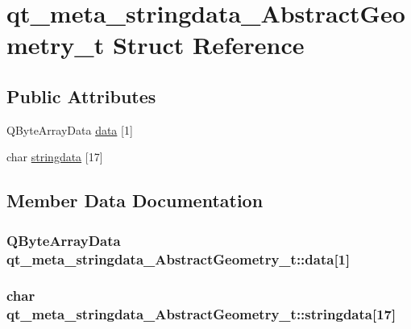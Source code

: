 \hypertarget{structqt__meta__stringdata___abstract_geometry__t}{\section{qt\+\_\+meta\+\_\+stringdata\+\_\+\+Abstract\+Geometry\+\_\+t Struct Reference}
\label{structqt__meta__stringdata___abstract_geometry__t}
}
\subsection*{Public Attributes}
\begin{DoxyCompactItemize}
\item 
Q\+Byte\+Array\+Data \hyperlink{structqt__meta__stringdata___abstract_geometry__t_a0498359dfe03ee62a8dc8336a3d38da8}{data} \mbox{[}1\mbox{]}
\item 
char \hyperlink{structqt__meta__stringdata___abstract_geometry__t_a248e5470bfc62180b66cc81f2e44ad74}{stringdata} \mbox{[}17\mbox{]}
\end{DoxyCompactItemize}


\subsection{Member Data Documentation}
\hypertarget{structqt__meta__stringdata___abstract_geometry__t_a0498359dfe03ee62a8dc8336a3d38da8}{
\subsubsection[{data}]{\setlength{\rightskip}{0pt plus 5cm}Q\+Byte\+Array\+Data qt\+\_\+meta\+\_\+stringdata\+\_\+\+Abstract\+Geometry\+\_\+t\+::data\mbox{[}1\mbox{]}}}\label{structqt__meta__stringdata___abstract_geometry__t_a0498359dfe03ee62a8dc8336a3d38da8}
\hypertarget{structqt__meta__stringdata___abstract_geometry__t_a248e5470bfc62180b66cc81f2e44ad74}{
\subsubsection[{stringdata}]{\setlength{\rightskip}{0pt plus 5cm}char qt\+\_\+meta\+\_\+stringdata\+\_\+\+Abstract\+Geometry\+\_\+t\+::stringdata\mbox{[}17\mbox{]}}}\label{structqt__meta__stringdata___abstract_geometry__t_a248e5470bfc62180b66cc81f2e44ad74}


